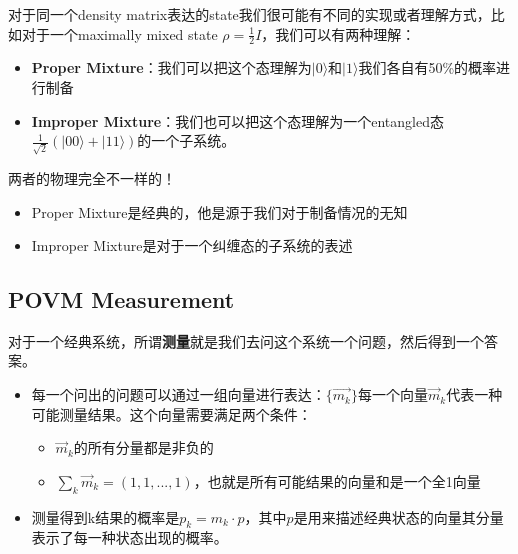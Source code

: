 对于同一个density matrix表达的state我们很可能有不同的实现或者理解方式，比如对于一个maximally mixed
state $ \rho = \frac{1}{2}I $，我们可以有两种理解：
\begin{itemize}
  \item \textbf{Proper Mixture}：我们可以把这个态理解为$ |0\rangle $和$ |1\rangle
    $我们各自有50\%的概率进行制备
  \item \textbf{Improper Mixture}：我们也可以把这个态理解为一个entangled态$
    \frac{1}{\sqrt{2}}(|00\rangle + |11\rangle) $的一个子系统。
\end{itemize}
两者的物理完全不一样的！
\begin{itemize}
  \item Proper Mixture是经典的，他是源于我们对于制备情况的无知
  \item Improper Mixture是对于一个纠缠态的子系统的表述
\end{itemize}

\subsection{POVM Measurement}


对于一个经典系统，所谓\textbf{测量}就是我们去问这个系统一个问题，然后得到一个答案。
\begin{itemize}
  \item 每一个问出的问题可以通过一组向量进行表达：$ \{ \vec{m_k}\} $每一个向量$ \vec{m}_k
    $代表一种可能测量结果。这个向量需要满足两个条件：
    \begin{itemize}
      \item $ \vec{m}_k $的所有分量都是非负的
      \item $ \sum_k \vec{m}_k = (1,1,...,1) $，也就是所有可能结果的向量和是一个全1向量
    \end{itemize}
  \item 测量得到k结果的概率是$ p_k = m_k \cdot p  $，其中$ p $是用来描述经典状态的向量其分量表示了每一种状态出现的概率。
\end{itemize}

\bigskip
{}

